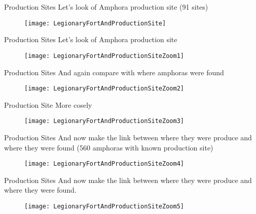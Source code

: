 \documentclass{beamer}
\begin{document}
\begin{frame}{Production Sites}
	Let's look of Amphora production site (91 sites)
	\begin{figure}[htp]
		\begin{center}
			\texttt{[image: LegionaryFortAndProductionSite]}
		\end{center}
	\end{figure}
\end{frame}
\begin{frame}{Production Sites}
	Let's look of Amphora production site
	\begin{figure}[htp]
		\begin{center}
			\texttt{[image: LegionaryFortAndProductionSiteZoom1]}
		\end{center}
	\end{figure}
\end{frame}
\begin{frame}{Production Sites}
	And again compare with where amphoras were found
	\begin{figure}[htp]
		\begin{center}
			\texttt{[image: LegionaryFortAndProductionSiteZoom2]}
		\end{center}
	\end{figure}
\end{frame}
\begin{frame}{Production Site}
	More cosely
	\begin{figure}[htp]
		\begin{center}
			\texttt{[image: LegionaryFortAndProductionSiteZoom3]}
		\end{center}
	\end{figure}
\end{frame}
\begin{frame}{Production Sites}
	And now make the link between where they were produce and where they were found (560 amphoras with known production site)
	\begin{figure}[htp]
		\begin{center}
			\texttt{[image: LegionaryFortAndProductionSiteZoom4]}
		\end{center}
	\end{figure}
\end{frame}
\begin{frame}{Production Sites}
	And now make the link between where they were produce and where they were found. 
	\begin{figure}[htp]
		\begin{center}
			\texttt{[image: LegionaryFortAndProductionSiteZoom5]}
		\end{center}
	\end{figure}
\end{frame}
\end{document}
